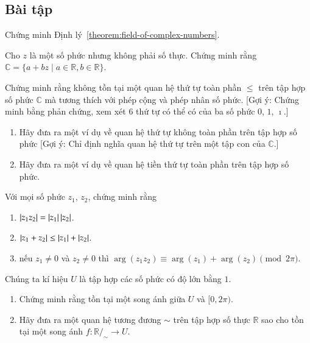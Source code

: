 \subsection{Bài tập}

\begin{exercise}
	Chứng minh Định lý~\ref{theorem:field-of-complex-numbers}.
\end{exercise}

\begin{exercise}
	Cho $z$ là một số phức nhưng không phải số thực. Chứng minh rằng $\mathbb{C} = \{ a + bz \mid a\in\mathbb{R}, b\in\mathbb{R} \}$.
\end{exercise}

\begin{exercise}\label{example:lost-of-total-ordering-on-C}
	Chứng minh rằng không tồn tại một quan hệ thứ tự toàn phần $\leq$ trên tập hợp số phức $\mathbb{C}$ mà tương thích với phép cộng và phép nhân số phức. [Gợi ý: Chứng minh bằng phản chứng, xem xét 6 thứ tự có thể có của ba số phức $0$, $1$, $\imath$.]
\end{exercise}

\begin{exercise}
    \begin{enumerate}[label={(\roman*)}]
        \item Hãy đưa ra một ví dụ về quan hệ thứ tự không toàn phần trên tập hợp số phức [Gợi ý: Chỉ định nghĩa quan hệ thứ tự trên một tập con của $\mathbb{C}$.]
        \item Hãy đưa ra một ví dụ về quan hệ tiền thứ tự toàn phần trên tập hợp số phức.
    \end{enumerate}
\end{exercise}

\begin{exercise}
	Với mọi số phức $z_{1}$, $z_{2}$, chứng minh rằng
	\begin{enumerate}[label={(\roman*)}]
		\item $\left\vert{z_{1}z_{2}}\right\vert = \left\vert{z_{1}}\right\vert\left\vert{z_{2}}\right\vert$.
		\item $\left\vert{z_{1} + z_{2}}\right\vert\leq \left\vert{z_{1}}\right\vert + \left\vert{z_{2}}\right\vert$.
		\item nếu $z_{1}\ne 0$ và $z_{2}\ne 0$ thì $\arg{(z_{1}z_{2})}\equiv \arg{(z_{1})} + \arg{(z_{2})} \pmod{2\pi}$.
	\end{enumerate}
\end{exercise}

\begin{exercise}
	Chúng ta kí hiệu $U$ là tập hợp các số phức có độ lớn bằng $1$.
	\begin{enumerate}[label={(\roman*)}]
		\item Chứng minh rằng tồn tại một song ánh giữa $U$ và $[0, 2\pi)$.
		\item Hãy đưa ra một quan hệ tương đương $\sim$ trên tập hợp số thực $\mathbb{R}$ sao cho tồn tại một song ánh $f: \mathbb{R}/_{\sim} \to U$.
	\end{enumerate}
\end{exercise}

